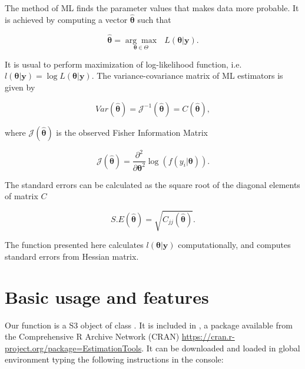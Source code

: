 \documentclass[nojss]{jss}
\begin{document}
The method of ML finds the parameter values that makes data more probable. It is achieved by computing a vector $\boldsymbol{\hat{\theta}}$ such that

\begin{equation} \label{maxim}
\hat{\boldsymbol{\theta}} = \underset{\bm{\theta} \in \Theta}{\arg\max} \text{ } L(\boldsymbol{\theta}|\bm{y}).
\end{equation}

It is usual to perform maximization of log-likelihood function, i.e. $l(\boldsymbol{\theta}|\bm{y})=\log L(\boldsymbol{\theta}|\bm{y})$. The variance-covariance matrix of ML estimators is given by

\begin{equation}
Var(\hat{\boldsymbol{\theta}}) = \mathcal{J}^{-1}(\hat{\boldsymbol{\theta}}) = C(\hat{\boldsymbol{\theta}}),
\end{equation}

where $\mathcal{J}(\hat{\boldsymbol{\theta}})$ is the observed Fisher Information Matrix

\begin{equation}
\mathcal{J}(\hat{\boldsymbol{\theta}}) = \frac{\partial^2}{\partial \bm{\theta}^2} \log(f(y_i|\boldsymbol{\theta})).
\end{equation}

The standard errors can be calculated as the square root of the diagonal elements of matrix $C$ \citep{Pawitan2013}%

\begin{equation}
S.E(\hat{\boldsymbol{\theta}}) = \sqrt{C_{jj}(\hat{\boldsymbol{\theta}})}.
\end{equation}

The  function presented here calculates $l(\boldsymbol{\theta}|\bm{y})$ computationally, and computes standard errors from Hessian matrix.

\section{Basic usage and features}

Our  function is a S3 object of class . It is included in , a package available from the Comprehensive R Archive Network (CRAN) \url{https://cran.r-project.org/package=EstimationTools}. It can be downloaded and loaded in global environment typing the following instructions in the console:
\end{document}

